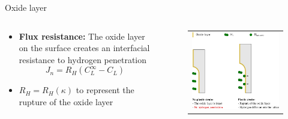 \documentclass[9pt]{beamer}
\begin{document}

\begin{frame}[noframenumbering]{Oxide layer}

    \begin{columns}

        \begin{column}{0.5\textwidth} 
        \begin{itemize}
            \item \textbf{Flux resistance:} The oxide layer on the surface
             creates an interfacial resistance to hydrogen penetration
             \vspace{0.5cm}
            \begin{equation*}
                \boxed{J_n = R_H (C_L^{\infty} - C_L)}
            \end{equation*}
            \vspace{0.15cm}
            \item $R_H = R_H(\kappa)$ to represent the rupture of the oxide layer
        \end{itemize}
    \end{column}

        \begin{column}{0.5\textwidth} 
            \begin{figure}
                \begin{tabular}{c}
                \includegraphics[width=\textwidth]{Images/oxide_layer.png} \\
                \end{tabular}
            \end{figure}
        \end{column}

    \end{columns}
    
\end{frame}
    
\end{document}

